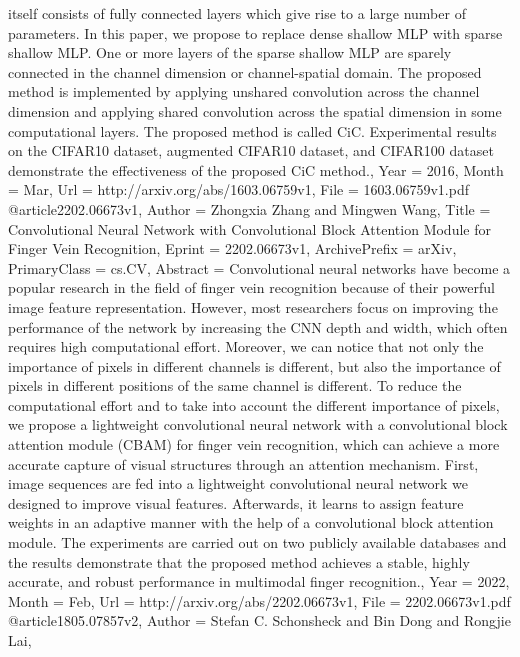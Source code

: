 {{{{{itself consists of fully connected layers which give rise to a large number of
parameters. In this paper, we propose to replace dense shallow MLP with sparse
shallow MLP. One or more layers of the sparse shallow MLP are sparely connected
in the channel dimension or channel-spatial domain. The proposed method is
implemented by applying unshared convolution across the channel dimension and
applying shared convolution across the spatial dimension in some computational
layers. The proposed method is called CiC. Experimental results on the CIFAR10
dataset, augmented CIFAR10 dataset, and CIFAR100 dataset demonstrate the
effectiveness of the proposed CiC method.},
Year          = {2016},
Month         = {Mar},
Url           = {http://arxiv.org/abs/1603.06759v1},
File          = {1603.06759v1.pdf}
}
@article{2202.06673v1,
Author        = {Zhongxia Zhang and Mingwen Wang},
Title         = {Convolutional Neural Network with Convolutional Block Attention Module
  for Finger Vein Recognition},
Eprint        = {2202.06673v1},
ArchivePrefix = {arXiv},
PrimaryClass  = {cs.CV},
Abstract      = {Convolutional neural networks have become a popular research in the field of
finger vein recognition because of their powerful image feature representation.
However, most researchers focus on improving the performance of the network by
increasing the CNN depth and width, which often requires high computational
effort. Moreover, we can notice that not only the importance of pixels in
different channels is different, but also the importance of pixels in different
positions of the same channel is different. To reduce the computational effort
and to take into account the different importance of pixels, we propose a
lightweight convolutional neural network with a convolutional block attention
module (CBAM) for finger vein recognition, which can achieve a more accurate
capture of visual structures through an attention mechanism. First, image
sequences are fed into a lightweight convolutional neural network we designed
to improve visual features. Afterwards, it learns to assign feature weights in
an adaptive manner with the help of a convolutional block attention module. The
experiments are carried out on two publicly available databases and the results
demonstrate that the proposed method achieves a stable, highly accurate, and
robust performance in multimodal finger recognition.},
Year          = {2022},
Month         = {Feb},
Url           = {http://arxiv.org/abs/2202.06673v1},
File          = {2202.06673v1.pdf}
}
@article{1805.07857v2,
Author        = {Stefan C. Schonsheck and Bin Dong and Rongjie Lai},
}}}}
